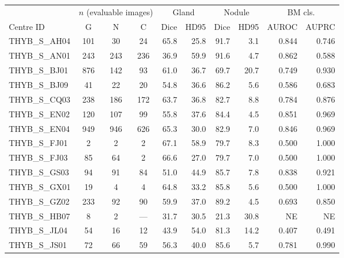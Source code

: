 \begin{responsetable}
\caption{}
\begin{adjustbox}{max width=\textwidth,center}
\begin{tabular}{@{}l *{3}{c} *{6}{r} @{}}
\toprule
 & \multicolumn{3}{c}{$n$ (evaluable images)} & \multicolumn{2}{c}{Gland} & \multicolumn{2}{c}{Nodule} & \multicolumn{2}{c}{BM cls.} \\
\cmidrule(lr){2-4}\cmidrule(lr){5-6}\cmidrule(lr){7-8}\cmidrule(lr){9-10}
{Centre ID} & G & N & C & Dice & HD95 & Dice & HD95 & AUROC & AUPRC \\
\midrule
THYB\_S\_AH04 & 101 & 30 & 24 & 65.8 & 25.8 & 91.7 & 3.1 & 0.844 & 0.746 \\
THYB\_S\_AN01 & 243 & 243 & 236 & 36.9 & 59.9 & 91.6 & 4.7 & 0.862 & 0.588 \\
THYB\_S\_BJ01 & 876 & 142 & 93 & 61.0 & 36.7 & 69.7 & 20.7 & 0.749 & 0.930 \\
THYB\_S\_BJ09 & 41 & 22 & 20 & 54.8 & 36.6 & 86.2 & 5.6 & 0.586 & 0.683 \\
THYB\_S\_CQ03 & 238 & 186 & 172 & 63.7 & 36.8 & 82.7 & 8.8 & 0.784 & 0.876 \\
THYB\_S\_EN02 & 120 & 107 & 99 & 55.8 & 37.6 & 84.4 & 4.5 & 0.851 & 0.969 \\
THYB\_S\_EN04 & 949 & 946 & 626 & 65.3 & 30.0 & 82.9 & 7.0 & 0.846 & 0.969 \\
THYB\_S\_FJ01 & 2 & 2 & 2 & 67.1 & 58.9 & 79.7 & 8.3 & 0.500 & 1.000 \\
THYB\_S\_FJ03 & 85 & 64 & 2 & 66.6 & 27.0 & 79.7 & 7.0 & 0.500 & 1.000 \\
THYB\_S\_GS03 & 94 & 91 & 84 & 51.0 & 44.9 & 85.7 & 7.8 & 0.838 & 0.921 \\
THYB\_S\_GX01 & 19 & 4 & 4 & 64.8 & 33.2 & 85.8 & 5.6 & 0.500 & 1.000 \\
THYB\_S\_GZ02 & 233 & 92 & 90 & 59.9 & 37.0 & 89.2 & 4.5 & 0.693 & 0.850 \\
THYB\_S\_HB07 & 8 & 2 & --- & 31.7 & 30.5 & 21.3 & 30.8 & NE & NE \\
THYB\_S\_JL04 & 54 & 16 & 12 & 43.9 & 54.0 & 81.3 & 14.2 & 0.407 & 0.491 \\
THYB\_S\_JS01 & 72 & 66 & 59 & 56.3 & 40.0 & 85.6 & 5.7 & 0.781 & 0.990 \\

\end{tabular}
\end{adjustbox}
\end{responsetable}
